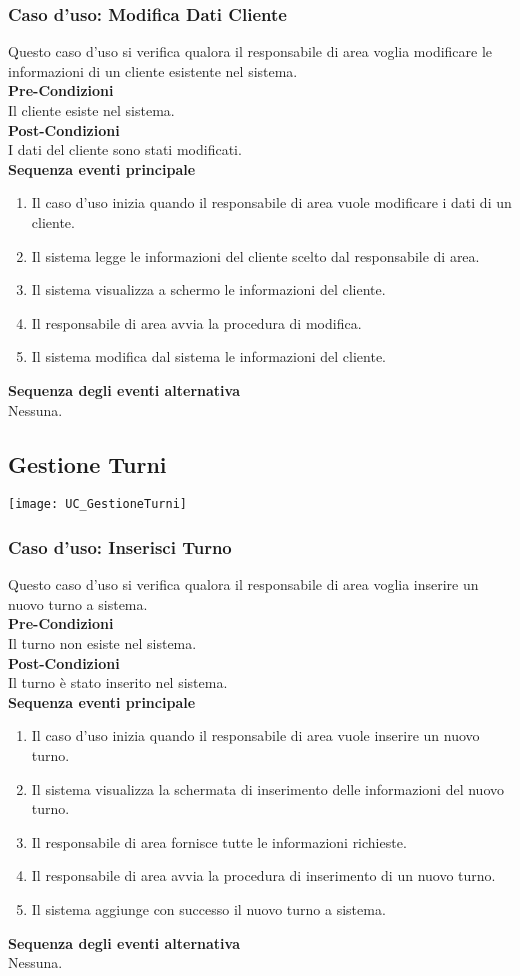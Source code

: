 \documentclass[green, fancy, 11pt]{elegantbook}
\begin{document}
\subsubsection{Caso d'uso: Modifica Dati Cliente}
\noindent
Questo caso d’uso si verifica qualora il responsabile di area voglia modificare le informazioni di un cliente esistente nel sistema.\\
\textbf{Pre-Condizioni}\\
Il cliente esiste nel sistema.\\
\textbf{Post-Condizioni}\\
I dati del cliente sono stati modificati.\\
\textbf{Sequenza eventi principale}
\begin{enumerate}
	\item Il caso d’uso inizia quando il responsabile di area vuole modificare i dati di un cliente.
	\item Il sistema legge le informazioni del cliente scelto dal responsabile di area.
	\item Il sistema visualizza a schermo le informazioni del cliente.
	\item Il responsabile di area avvia la procedura di modifica.
	\item Il sistema modifica dal sistema le informazioni del cliente.
\end{enumerate}
\textbf{Sequenza degli eventi alternativa}\\
Nessuna.
\newpage

\subsection{Gestione Turni}
\texttt{[image: UC\_GestioneTurni]}

\subsubsection{Caso d'uso: Inserisci Turno}
\noindent
Questo caso d’uso si verifica qualora il responsabile di area voglia inserire un nuovo turno a sistema.\\
\textbf{Pre-Condizioni}\\
Il turno non esiste nel sistema.\\
\textbf{Post-Condizioni}\\
Il turno è stato inserito nel sistema.\\
\textbf{Sequenza eventi principale}
\begin{enumerate}
	\item Il caso d’uso inizia quando il responsabile di area vuole inserire un nuovo turno.
    \item Il sistema visualizza la schermata di inserimento delle informazioni del nuovo turno.
	\item Il responsabile di area fornisce tutte le informazioni richieste.
	\item Il responsabile di area avvia la procedura di inserimento di un nuovo turno.
	\item Il sistema aggiunge con successo il nuovo turno a sistema.
\end{enumerate}
\textbf{Sequenza degli eventi alternativa}\\
Nessuna.
\newpage
\end{document}
